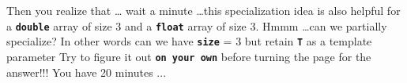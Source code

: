 Then you realize that \ldots{} wait a minute \ldots this specialization idea is also helpful for a \texttt{\textbf{double}} array of size 3 and a \texttt{\textbf{float}} array of size 3. Hmmm \ldots can we partially specialize? In other words can we have \texttt{\textbf{size}} = 3 but retain \texttt{\textbf{T}} as a template parameter Try to figure it out \texttt{\textbf{on your own}} before turning the page for the answer!!! You have 20 minutes ...

